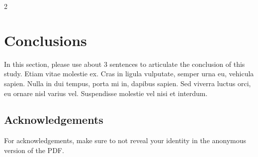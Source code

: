 \documentclass[10pt]{article}
\begin{document}
\begin{multicols}{2}
\section{Conclusions}
In this section, please use about 3 sentences to articulate the conclusion of this study. Etiam vitae molestie ex. Cras in ligula vulputate, semper urna eu, vehicula sapien. Nulla in dui tempus, porta mi in, dapibus sapien. Sed viverra luctus orci, eu ornare nisl varius vel. Suspendisse molestie vel nisi et interdum.


\subsection{Acknowledgements}
\footnotesize
For acknowledgements, make sure to not reveal your identity in the anonymous version of the PDF.



\end{multicols}
\end{document}
